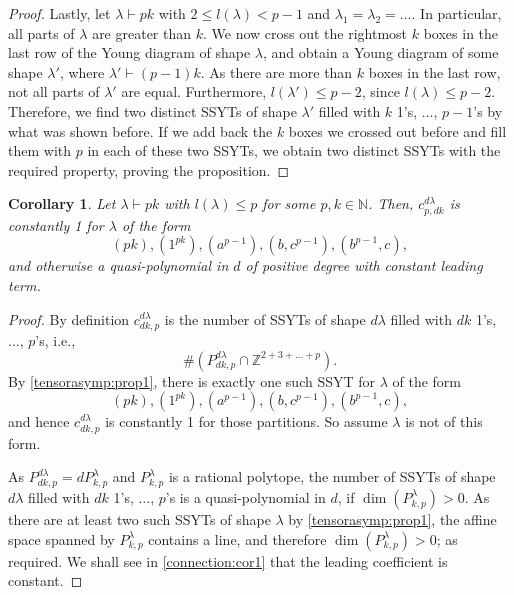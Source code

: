 \documentclass[a4paper]{amsart}
\newtheorem{corollary}{Corollary}
\def\N{{\mathbb{N}}}
\def\Z{{\mathbb{Z}}}
\begin{document}
\begin{proof}
	Lastly, let $\lambda\vdash pk$ with $2\leq l(\lambda)<p-1$ and $\lambda_1=\lambda_2=\ldots$.
	In particular, all parts of $\lambda$ are greater than $k$.
	We now cross out the rightmost $k$ boxes in the last row of the Young diagram of shape $\lambda$,
	and obtain a Young diagram of some shape $\lambda'$, where $\lambda'\vdash (p-1)k$.
	As there are more than $k$ boxes in the last row, not all parts of $\lambda'$ are equal.
	Furthermore, $l(\lambda')\leq p-2$, since $l(\lambda)\leq p-2$.
	Therefore, we find two distinct SSYTs of shape $\lambda'$ filled with $k$ 1's, $\ldots$, $p-1$'s by what was shown before.
	If we add back the $k$ boxes we crossed out before and fill them with $p$ in each of these two SSYTs,
	we obtain two distinct SSYTs with the required property, proving the proposition.
\end{proof}

\begin{corollary}\label{tensorasymp:cor2}
	Let $\lambda\vdash pk$ with $l(\lambda)\leq p$ for some $p,k\in\N$.
	Then,
	$c_{p,dk}^{d\lambda}$ is constantly 1 for $\lambda$ of the form
	\begin{displaymath}
		(pk),(1^{pk}),(a^{p-1}),(b,c^{p-1}),(b^{p-1},c),
	\end{displaymath}
	and otherwise a quasi-polynomial in $d$ of positive degree with constant leading term.
\end{corollary}
\begin{proof}
	By definition $c_{dk,p}^{d\lambda}$ is the number of SSYTs of shape $d\lambda$ filled with $dk$ 1's, $\ldots$, $p$'s, i.e.,
	\begin{displaymath}
		\#\left(P_{dk,p}^{d\lambda}\cap\Z^{2+3+\ldots+p}\right).
	\end{displaymath}
	By \cref{tensorasymp:prop1}, there is exactly one such SSYT for $\lambda$ of the form
	\begin{displaymath}
		(pk),(1^{pk}),(a^{p-1}),(b,c^{p-1}),(b^{p-1},c),
	\end{displaymath}
	and hence $c_{dk,p}^{d\lambda}$ is constantly 1 for those partitions.
	So assume $\lambda$ is not of this form.

	As $P_{dk,p}^{d\lambda}=dP_{k,p}^{\lambda}$ and $P_{k,p}^{\lambda}$ is a rational polytope,
	the number of SSYTs of shape $d\lambda$ filled with $dk$ 1's, $\ldots$, $p$'s is a quasi-polynomial in $d$,
	if $\dim(P_{k,p}^\lambda)>0$.
	As there are at least two such SSYTs of shape $\lambda$ by \cref{tensorasymp:prop1},
	the affine space spanned by $P_{k,p}^\lambda$ contains a line, and therefore $\dim(P_{k,p}^\lambda)>0$; as required.
	We shall see in \cref{connection:cor1} that the leading coefficient is constant.
\end{proof}
\end{document}

